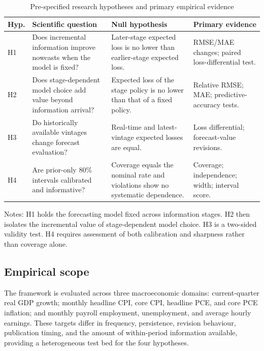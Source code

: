 \begin{table}[H]
\centering
\caption{Pre-specified research hypotheses and primary empirical evidence}
\label{tab:hypotheses}
\begin{threeparttable}
\footnotesize
\setlength{\tabcolsep}{3pt}
\begin{tabular}{>{\raggedright\arraybackslash}p{}>{\raggedright\arraybackslash}p{}>{\raggedright\arraybackslash}p{}>{\raggedright\arraybackslash}p{}}
\toprule
Hyp. & Scientific question & Null hypothesis & Primary evidence \\
\midrule
H1 & Does incremental information improve nowcasts when the model is fixed? & Later-stage expected loss is no lower than earlier-stage expected loss. & RMSE/MAE changes; paired loss-differential test. \\
H2 & Does stage-dependent model choice add value beyond information arrival? & Expected loss of the stage policy is no lower than that of a fixed policy. & Relative RMSE; MAE; predictive-accuracy tests. \\
H3 & Do historically available vintages change forecast evaluation? & Real-time and latest-vintage expected losses are equal. & Loss differential; forecast-value revisions. \\
H4 & Are prior-only 80\% intervals calibrated and informative? & Coverage equals the nominal rate and violations show no systematic dependence. & Coverage; independence; width; interval score. \\
\bottomrule
\end{tabular}
\begin{tablenotes}[flushleft]\footnotesize
\item Notes: H1 holds the forecasting model fixed across information stages. H2 then isolates the incremental value of stage-dependent model choice. H3 is a two-sided validity test. H4 requires assessment of both calibration and sharpness rather than coverage alone.
\end{tablenotes}
\end{threeparttable}
\end{table}

\subsection{Empirical scope}
\label{subsec:empirical_scope}

The framework is evaluated across three macroeconomic domains: current-quarter real GDP growth; monthly headline CPI, core CPI, headline PCE, and core PCE inflation; and monthly payroll employment, unemployment, and average hourly earnings. These targets differ in frequency, persistence, revision behaviour, publication timing, and the amount of within-period information available, providing a heterogeneous test bed for the four hypotheses.


